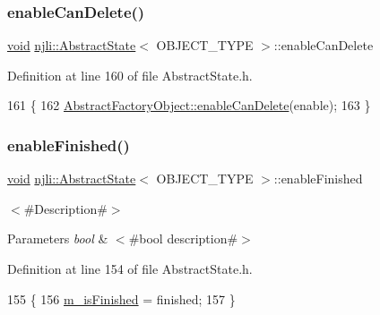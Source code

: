 \mbox{\label{classnjli_1_1_scene_state_a4ed007508bd8f80af668a302376b7d1a}} 
\subsubsection{\texorpdfstring{enable\+Can\+Delete()}{enableCanDelete()}}
{\footnotesize\ttfamily \mbox{\hyperlink{_thread_8h_af1e856da2e658414cb2456cb6f7ebc66}{void}} \mbox{\hyperlink{classnjli_1_1_abstract_state}{njli\+::\+Abstract\+State}}$<$ O\+B\+J\+E\+C\+T\+\_\+\+T\+Y\+PE $>$\+::enable\+Can\+Delete}



Definition at line 160 of file Abstract\+State.\+h.


\begin{DoxyCode}
161   \{
162     \mbox{\hyperlink{classnjli_1_1_abstract_factory_object_a678b8f28320f6a7e2aa38d5ef72889a8}{AbstractFactoryObject::enableCanDelete}}(enable);
163   \}
\end{DoxyCode}
\mbox{\label{classnjli_1_1_scene_state_aa4e66d0016cd5c43dc3a485eaf558174}} 
\subsubsection{\texorpdfstring{enable\+Finished()}{enableFinished()}}
{\footnotesize\ttfamily \mbox{\hyperlink{_thread_8h_af1e856da2e658414cb2456cb6f7ebc66}{void}} \mbox{\hyperlink{classnjli_1_1_abstract_state}{njli\+::\+Abstract\+State}}$<$ O\+B\+J\+E\+C\+T\+\_\+\+T\+Y\+PE $>$\+::enable\+Finished}

$<$\#\+Description\#$>$


\begin{DoxyParams}{Parameters}
{\em bool} & $<$\#bool description\#$>$ \\
\hline
\end{DoxyParams}


Definition at line 154 of file Abstract\+State.\+h.


\begin{DoxyCode}
155   \{
156     \mbox{\hyperlink{classnjli_1_1_abstract_state_a445a5d1ac7572b8b01b81937c89e960c}{m\_isFinished}} = finished;
157   \}
\end{DoxyCode}
\mbox{\label{classnjli_1_1_scene_state_a6d0c25d933938e8542f7bd17fdaab8e0}} 
